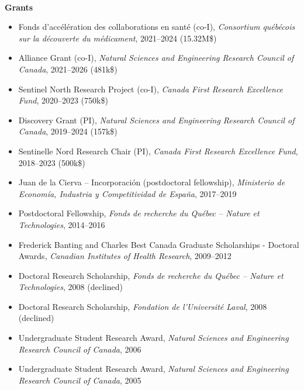 \documentclass[11pt]{article}
\newlength{\BoxWidth}
\newcommand{\TitreA}[1]{\colorbox{background}{\makebox[\BoxWidth][c]{\Large\textrm{\textsc{#1}}}}\vspace{0.75\baselineskip}\\}
\newcommand{\SousTitreA}[2]{{\normalsize\textbf{#1} #2 \vspace{-0.5\baselineskip}}}
\newcommand{\SousTitreB}[2]{{\vspace{0.4\baselineskip}\SousTitreA{#1}{#2}}}
\newlength{\EspaceListe}
\begin{document}
%
%
%
%
%
\TitreA{Funding and Awards}
%
\SousTitreA{Grants}{}
%
\begin{itemize}[itemsep=\EspaceListe]
  \item Fonds d'accélération des collaborations en santé (co-I), \textit{Consortium québécois sur la découverte du médicament}, 2021--2024 (15.32M\$)
  \item Alliance Grant (co-I), \textit{Natural Sciences and Engineering Research Council of Canada}, 2021--2026 (481k\$)
  \item Sentinel North Research Project (co-I), \textit{Canada First Research Excellence Fund}, 2020--2023 (750k\$)
  \item Discovery Grant (PI), \textit{Natural Sciences and Engineering Research Council of Canada}, 2019--2024 (157k\$)
  \item Sentinelle Nord Research Chair (PI), \textit{Canada First Research Excellence Fund}, 2018--2023 (500k\$)
\end{itemize}
%
%
%
\SousTitreB{Fellowships}{}
%
\begin{itemize}[itemsep=\EspaceListe]
  \item Juan de la Cierva -- Incorporaci\'on (postdoctoral fellowship), \textit{Ministerio de Econom\'ia, Industria y Competitividad de Espa\~{n}a}, 2017--2019
  \item Postdoctoral Fellowship, \textit{Fonds de recherche du Qu\'ebec -- Nature et Technologies}, 2014--2016
  \item Frederick Banting and Charles Best Canada Graduate Scholarships - Doctoral Awards, \textit{Canadian Institutes of Health Research}, 2009--2012
  \item Doctoral Research Scholarship, \textit{Fonds de recherche du Qu\'ebec -- Nature et Technologies}, 2008 (declined)
  \item Doctoral Research Scholarship, \textit{Fondation de l'Universit\'e Laval}, 2008 (declined)
  \item Undergraduate Student Research Award, \textit{Natural Sciences and Engineering Research Council of Canada}, 2006
  \item Undergraduate Student Research Award, \textit{Natural Sciences and Engineering Research Council of Canada}, 2005
\end{itemize}
\end{document}
